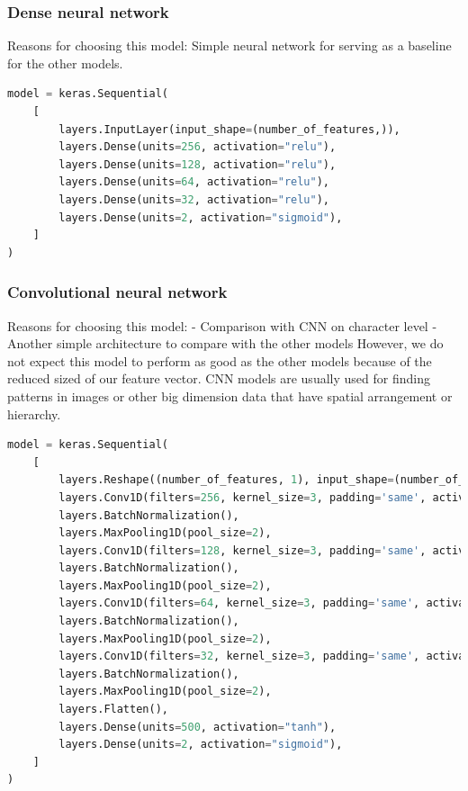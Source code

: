 \documentclass{article}
\begin{document}
    \subsubsection{Dense neural network}
    Reasons for choosing this model:
    Simple neural network for serving as a baseline for the other models.

    \begin{lstlisting}[language=Python, caption=DNN on feature vector architecture]
model = keras.Sequential(
    [
        layers.InputLayer(input_shape=(number_of_features,)),
        layers.Dense(units=256, activation="relu"),
        layers.Dense(units=128, activation="relu"),
        layers.Dense(units=64, activation="relu"),
        layers.Dense(units=32, activation="relu"),
        layers.Dense(units=2, activation="sigmoid"),
    ]
)
    \end{lstlisting}

    \subsubsection{Convolutional neural network}
    Reasons for choosing this model:
    - Comparison with CNN on character level
    - Another simple architecture to compare with the other models
    However, we do not expect this model to perform as good as the other models because of the reduced sized of our feature vector.
    CNN models are usually used for finding patterns in images or other big dimension data that have spatial arrangement or hierarchy.

    \begin{lstlisting}[language=Python, caption=CNN on feature vector architecture]
model = keras.Sequential(
    [
        layers.Reshape((number_of_features, 1), input_shape=(number_of_features,)),
        layers.Conv1D(filters=256, kernel_size=3, padding='same', activation="tanh"),
        layers.BatchNormalization(),
        layers.MaxPooling1D(pool_size=2),
        layers.Conv1D(filters=128, kernel_size=3, padding='same', activation="tanh"),
        layers.BatchNormalization(),
        layers.MaxPooling1D(pool_size=2),
        layers.Conv1D(filters=64, kernel_size=3, padding='same', activation="tanh"),
        layers.BatchNormalization(),
        layers.MaxPooling1D(pool_size=2),
        layers.Conv1D(filters=32, kernel_size=3, padding='same', activation="tanh"),
        layers.BatchNormalization(),
        layers.MaxPooling1D(pool_size=2),
        layers.Flatten(),
        layers.Dense(units=500, activation="tanh"),
        layers.Dense(units=2, activation="sigmoid"),
    ]
)
    \end{lstlisting}
\end{document}
